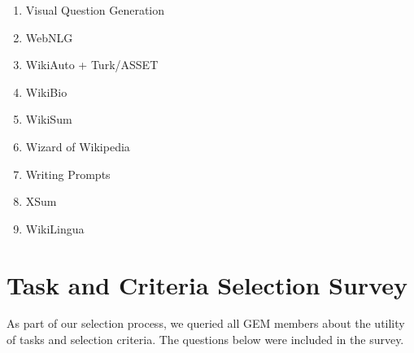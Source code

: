 \documentclass[11pt,a4paper]{article}
\newcommand{\GEM}{\textsc{GEM}}
\begin{document}
\begin{enumerate}[itemsep=0mm]
    \item Visual Question Generation~\citep{shukla-etal-2019-ask,li2018visual}
    \item WebNLG~\citep{gardent2017webnlg}
    \item WikiAuto + Turk/ASSET~\citep{jiang-etal-2020-neural,xu-etal-2016-optimizing,alva-manchego-etal-2020-asset}
    \item WikiBio~\citep{lebret2016neural}
    \item WikiSum~\citep{liu2018generating}
    \item Wizard of Wikipedia~\citep{dinan2018wizard}
    \item Writing Prompts~\citep{fan-etal-2018-hierarchical}
    \item XSum~\citep{narayan2018don}
    \item WikiLingua~\citep{ladhak2020wikilingua}
\end{enumerate}

\section{Task and Criteria Selection Survey}
\label{app:survey}

As part of our selection process, we queried all \GEM{} members about the utility of tasks and selection criteria. The questions below were included in the survey. 
\end{document}
